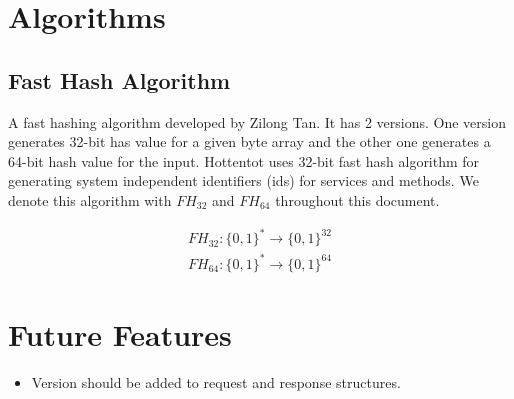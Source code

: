 \documentclass[10pt,a4paper]{article}
\begin{document}
\section{Algorithms}

\subsection{Fast Hash Algorithm}
A fast hashing algorithm developed by Zilong Tan. It has 2 versions. One version generates 32-bit has value for a given byte array and the other one generates a 64-bit hash value for the input. Hottentot uses 32-bit fast hash algorithm for generating system independent identifiers (ids) for services and methods. We denote this algorithm with $ FH_{32} $ and $ FH_{64} $ throughout this document.

\begin{equation}
\begin{split}
  FH_{32}: \{0, 1\}^* \to \{0, 1\}^{32}  \\
  FH_{64}: \{0, 1\}^* \to \{0, 1\}^{64}
\end{split}
\end{equation}


\section{Future Features}
\begin{itemize}
  \item Version should be added to request and response structures.
\end{itemize}
\end{document}
